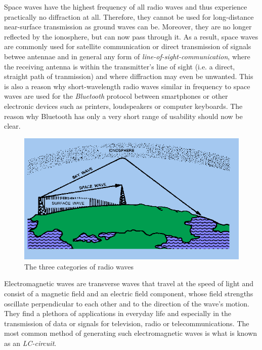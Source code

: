 
Space waves have the highest frequency of all radio waves and thus experience practically no diffraction at all. Therefore, they cannot be used for long-distance near-surface transmission as ground waves can be. Moreover, they are no longer reflected by the ionosphere, but can now pass through it. As a result, space waves are commonly used for satellite communication or direct transmission of signals betwee antennae and in general any form of \emph{line-of-sight-communication}, where the receiving antenna is within the transmitter's line of sight (i.e. a direct, straight path of tranmission) and where diffraction may even be unwanted. This is also a reason why short-wavelength radio waves similar in frequency to space waves are used for the \emph{Bluetooth} protocol between smartphones or other electronic devices such as printers, loudspeakers or computer keyboards. The reason why Bluetooth has only a very short range of usability should now be clear.

\begin{figure}[h!]
	\centering
	\includegraphics[scale=0.65]{img/radio}
	\caption*{The three categories of radio waves}
\end{figure}



Electromagnetic waves are transverse waves that travel at the speed of light and consist of a magnetic field and an electric field component, whose field strengths oscillate perpendicular to each other and to the direction of the wave's motion. They find a plethora of applications in everyday life and especially in the transmission of data or signals for television, radio or telecommunications. The most common method of generating such electromagnetic waves is what is known as an \emph{LC-circuit}.

